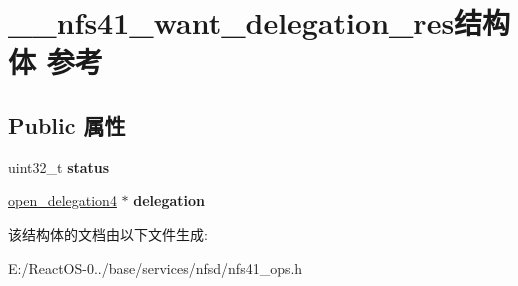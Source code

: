 \hypertarget{struct____nfs41__want__delegation__res}{}\section{\+\_\+\+\_\+nfs41\+\_\+want\+\_\+delegation\+\_\+res结构体 参考}
\label{struct____nfs41__want__delegation__res}
\subsection*{Public 属性}
\begin{DoxyCompactItemize}
\item 
\mbox{\label{struct____nfs41__want__delegation__res_ac8b75c418ce56efbd3df2e58bc0e71dc}} 
uint32\+\_\+t {\bfseries status}
\item 
\mbox{\label{struct____nfs41__want__delegation__res_a9491094b5d8d44045da57aad179feb6c}} 
\hyperlink{struct____open__delegation4}{open\+\_\+delegation4} $\ast$ {\bfseries delegation}
\end{DoxyCompactItemize}


该结构体的文档由以下文件生成\+:\begin{DoxyCompactItemize}
\item 
E\+:/\+React\+O\+S-\/0../base/services/nfsd/nfs41\+\_\+ops.\+h\end{DoxyCompactItemize}
